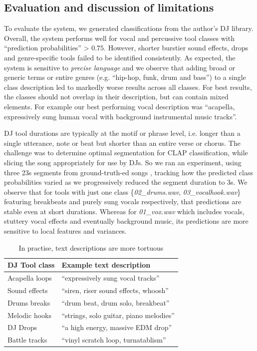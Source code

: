 \documentclass{article}
\begin{document}
\subsection{Evaluation and discussion of limitations}
To evaluate the system, we generated classifications from the author's DJ library. Overall, the system performs well for vocal and percussive tool classes with ``prediction probabilities'' > $0.75$. However, shorter burstier sound effects, drops and genre-specific tools failed to be identified consistently. As expected, the system is sensitive to \textit{precise language} and we observe that adding broad or generic terms or entire genres (e.g. ``hip-hop, funk, drum and bass'') to a single class description led to markedly worse results across all classes. For best results, the classes should not overlap in their description, but can contain mixed elements. For example our best performing vocal description was ``acapella, expressively sung human vocal with background instrumental music tracks''. 

DJ tool durations are typically at the motif or phrase level, i.e. longer than a single utterance, note or beat but shorter than an entire verse or chorus. The challenge was to determine optimal segmentation for CLAP classification, while slicing the song appropriately for use by DJs. So we ran an experiment, using three 23s segments from ground-truth-ed songs \cite{MSS00401998, 91vocals2024}, tracking how the predicted class probabilities varied as we progressively reduced the segment duration to 3s.  We observe that for tools with just one class \{\textit{02\_drums.wav}, \textit{03\_vocalhook.wav}\} featuring breakbeats and purely sung vocals respectively, that predictions are stable even at short durations. Whereas for \textit{01\_vox.wav} which includes vocals,  stuttery vocal effects and eventually background music, its predictions are more sensitive to local features and variances.

\begin{table}
 \begin{center}
 \begin{tabular}{ll}
  \midrule
  \textbf{DJ Tool class} & \textbf{Example text description} \\
  \midrule
	Acapella loops & ``expressively sung vocal tracks''  \\
	Sound effects &  ``siren, riser sound effects, whoosh''\\
	Drums breaks  & ``drum beat, drum solo, breakbeat''  \\
	Melodic hooks & ``strings, solo guitar, piano melodies''  \\
	DJ Drops & ``a high energy, massive EDM drop''  \\
	Battle tracks & ``vinyl scratch loop, turnatablism''   \\
 \end{tabular}
\end{center}
 \caption{In practise, text descriptions are more tortuous}
 \label{tab:djtool_texts}
\end{table}
\end{document}
